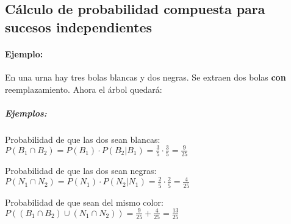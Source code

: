 \subsection{Cálculo de probabilidad compuesta para sucesos independientes}
\paragraph{Ejemplo:} En una urna hay tres bolas blancas y dos negras. Se extraen dos bolas \textbf{con} reemplazamiento. Ahora el árbol quedará:




\subparagraph{Ejemplos:}\begin{list}{-}{}
\item Probabilidad de que las dos sean blancas:\\
$P(B_1\cap B_2)=P(B_1)\cdot P(B_2|B_1)=\frac{3}{5}\cdot\frac{3}{5}=\frac{9}{25}$
\item Probabilidad de que las dos sean negras:\\ 
$P(N_1\cap N_2)=P(N_1)\cdot P(N_2|N_1)=\frac{2}{5}\cdot\frac{2}{5}=\frac{4}{25}$
\item Probabilidad de que sean del mismo color: \\
$P((B_1\cap B_2)\cup (N_1\cap N_2))=\frac{9}{25}+\frac{4}{25}=\frac{13}{25}$
\end{list}


